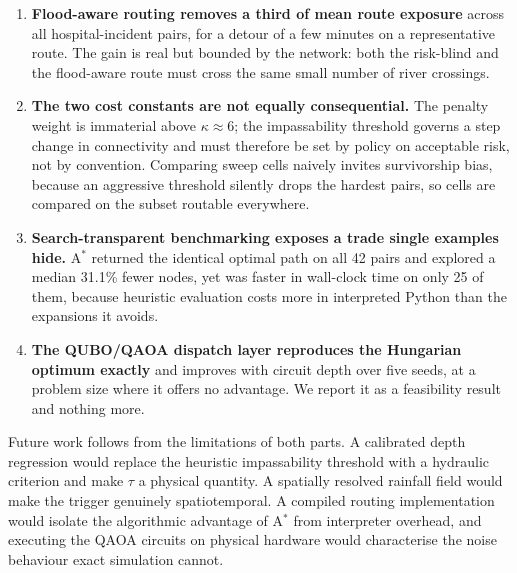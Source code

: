 \documentclass[journal]{IEEEtran}
\begin{document}
\begin{enumerate}
\item \textbf{Flood-aware routing removes a third of mean route exposure} across
      all hospital-incident pairs, for a detour of a few minutes on a
      representative route. The gain is real but bounded by the network: both
      the risk-blind and the flood-aware route must cross the same small number
      of river crossings.
\item \textbf{The two cost constants are not equally consequential.} The penalty
      weight is immaterial above $\kappa\approx6$; the impassability threshold
      governs a step change in connectivity and must therefore be set by policy
      on acceptable risk, not by convention. Comparing sweep cells naively
      invites survivorship bias, because an aggressive threshold silently drops
      the hardest pairs, so cells are compared on the subset routable
      everywhere.
\item \textbf{Search-transparent benchmarking exposes a trade single examples
      hide.} A$^\ast$ returned the identical optimal path on all 42 pairs and
      explored a median 31.1\% fewer nodes, yet was faster in wall-clock time on
      only 25 of them, because heuristic evaluation costs more in interpreted
      Python than the expansions it avoids.
\item \textbf{The QUBO/QAOA dispatch layer reproduces the Hungarian optimum
      exactly} and improves with circuit depth over five seeds, at a problem
      size where it offers no advantage. We report it as a feasibility result
      and nothing more.
\end{enumerate}

Future work follows from the limitations of both parts. A calibrated depth
regression would replace the heuristic impassability threshold with a hydraulic
criterion and make $\tau$ a physical quantity. A spatially resolved rainfall
field would make the trigger genuinely spatiotemporal. A compiled routing
implementation would isolate the algorithmic advantage of A$^\ast$ from
interpreter overhead, and executing the QAOA circuits on physical hardware would
characterise the noise behaviour exact simulation cannot.
\end{document}
